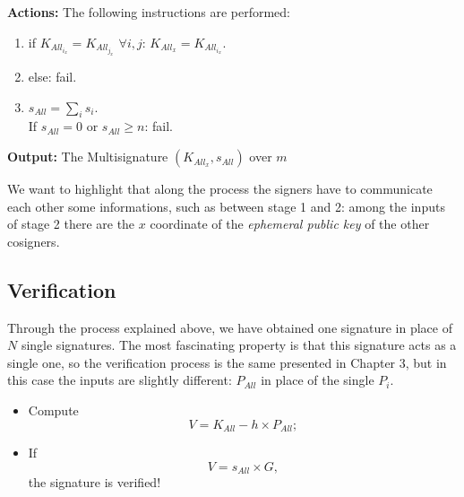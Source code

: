 \textbf{Actions:} The following instructions are performed:

\hspace{1.2cm}
\begin{minipage}[l]{2\linewidth}
	\begin{enumerate}
		\item if $K_{All_{i_{x}}}=K_{All_{j_{x}}}$ $\forall i,j$: $K_{All_{x}}= K_{All_{i_{x}}}$.
		\item else: fail.
		\item $s_{All}=\sum_{i}{s_{i}}$.\\
		If $s_{All}=0$ or $s_{All}\geq n$: fail.
	\end{enumerate}
\end{minipage}

\textbf{Output:} The Multisignature $(K_{All_{x}}, s_{All})$ over $m$

We want to highlight that along the process the signers have to communicate each other some informations, such as between stage 1 and 2: among the inputs of stage 2 there are the $x$ coordinate of the \textit{ephemeral public key} of the other cosigners.
\subsection{Verification}
Through the process explained above, we have obtained one signature in place of $N$ single signatures. The most fascinating property is that this signature acts as a single one, so the verification process is the same presented in Chapter 3, but in this case the inputs are slightly different: $P_{All}$ in place of the single $P_{i}$.
\begin{itemize}
	\item Compute
	\begin{equation}
	\label{eqn:verifM1}
	V = K_{All} - h \times P_{All};
	\end{equation}
	\item If 
	\begin{equation}
	\label{eqn:verifM2}
	V = s_{All} \times G,
	\end{equation} the signature is verified!
\end{itemize}

